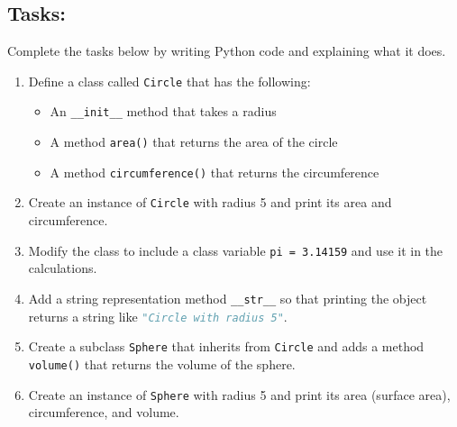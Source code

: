 \documentclass[11pt]{article}
\begin{document}
\subsection*{Tasks:}
Complete the tasks below by writing Python code and explaining what it does.
\begin{enumerate}[label=\arabic*.]
\item Define a class called \texttt{Circle} that has the following:
\begin{itemize}
    \item An \lstinline{__init__} method that takes a radius
    \item A method \texttt{area()} that returns the area of the circle
    \item A method \texttt{circumference()} that returns the circumference
\end{itemize}
\item Create an instance of \texttt{Circle} with radius 5 and print its area and circumference.
\item Modify the class to include a class variable \lstinline{pi = 3.14159} and use it in the calculations.
\item Add a string representation method \lstinline{__str__} so that printing the object returns a string like \lstinline[language=python]{"Circle with radius 5"}.
\item Create a subclass \texttt{Sphere} that inherits from \texttt{Circle} and adds a method \texttt{volume()} that returns the volume of the sphere.
\item Create an instance of \texttt{Sphere} with radius 5 and print its area (surface area), circumference, and volume.
\end{enumerate}
\end{document}
